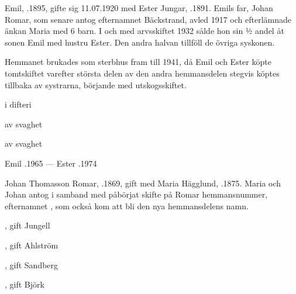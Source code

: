 


Emil, .1895, gifte sig 11.07.1920 med Ester Jungar, .1891. Emils far, Johan Romar, som senare antog efternamnet Bäckstrand, avled 1917 och efterlämnade änkan Maria med 6 barn. I och med arvsskiftet 1932 sålde hon sin ½ andel åt sonen Emil  med hustru Ester. Den andra halvan tillföll de övriga syskonen.

Hemmanet brukades som sterbhus fram till 1941, då Emil och Ester köpte tomtskiftet varefter största delen av den andra hemmansdelen stegvis köptes tillbaka av systrarna, börjande med utskogsskiftet.
\begin{jhchildren}
  \item {}
  \item {} i difteri
  \item {}
  \item {}
  \item {} av svaghet
  \item {} av svaghet
\end{jhchildren}

Emil .1965  ---  Ester .1974


Johan Thomasson Romar, .1869, gift med Maria Hägglund, .1875. Maria och Johan antog i samband med påbörjat skifte på Romar hemmansnummer, efternamnet , som också kom att bli den nya hemmansdelens namn.
\begin{jhchildren}
  \item {}
  \item {}, gift Jungell
  \item {}, gift Ahlström
  \item {}, gift Sandberg
  \item {}
  \item {}, gift Björk
\end{jhchildren}

